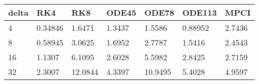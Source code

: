 \begin{tabular}{lllllll}
delta & RK4 & RK8 & ODE45 & ODE78 & ODE113 & MPCI \\ 
\hline 
4 & 0.34846 & 1.6471 & 1.3437 & 1.5586 & 0.88952 & 2.7436 \\ 
8 & 0.58945 & 3.0625 & 1.6952 & 2.7787 & 1.5416 & 2.4543 \\ 
16 & 1.1307 & 6.1095 & 2.6028 & 5.5982 & 2.8425 & 2.7159 \\ 
32 & 2.3007 & 12.0844 & 4.3397 & 10.9495 & 5.4028 & 4.9597 \\ 
\hline 
\end{tabular}